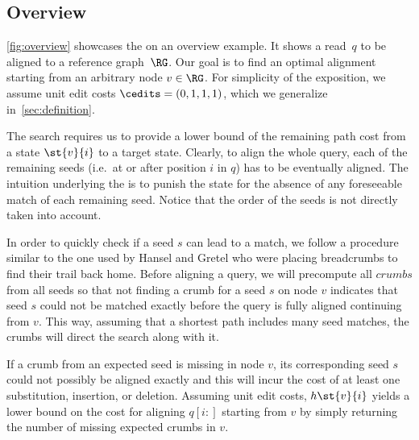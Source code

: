 

\subsection{Overview} \label{sec:overview}
\cref{fig:overview} showcases the \seedh on an overview example. It shows a
read~$q$ to be aligned to a reference graph~$\RG$. Our goal is to find an
optimal alignment starting from an arbitrary node $v \in \RG$.
%
For simplicity of the exposition, we assume unit edit costs $\cedits =
(0,1,1,1)$, which we generalize in~\cref{sec:definition}.

The \A search requires us to provide a lower bound of the remaining path cost
from a state $\st{v}{i}$ to a target state. Clearly, to align the whole query,
each of the remaining seeds (i.e.~at or after position $i$ in $q$) has to be
eventually aligned. The intuition underlying the \seedh is to punish the state
for the absence of any foreseeable match of each remaining seed. Notice that the
order of the seeds is not directly taken into account.

In order to quickly check if a seed $s$ can lead to a match, we follow a
procedure similar to the one used by Hansel and Gretel who were placing
breadcrumbs to find their trail back home. Before aligning a query, we will
precompute all $\textit{crumbs}$ from all seeds so that not finding a crumb for
a seed $s$ on node $v$ indicates that seed $s$ could not be matched exactly
before the query is fully aligned continuing from $v$. This way, assuming that a
shortest path includes many seed matches, the crumbs will direct the \A search
along with it.

If a crumb from an expected seed is missing in node $v$, its corresponding seed
$s$ could not possibly be aligned exactly and this will incur the cost of at
least one substitution, insertion, or deletion. Assuming unit edit costs,
$h\st{v}{i}$ yields a lower bound on the cost for aligning $q[i{:}]$ starting
from $v$ by simply returning the number of missing expected crumbs in $v$.


